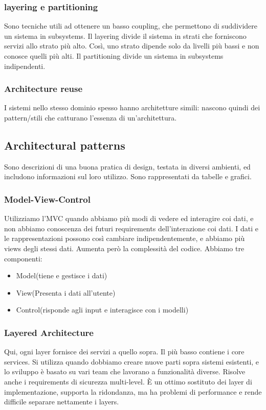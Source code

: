 \documentclass{article}
\begin{document}
\subsubsection{layering e partitioning}
Sono tecniche utili ad ottenere un basso coupling, che permettono di suddividere un sistema in subsystems.
Il layering divide il sistema in strati che forniscono servizi allo strato più alto. 
Così, uno strato dipende solo da livelli più bassi e non conosce quelli più alti. Il partitioning divide un sistema in subsystems
indipendenti.


\subsubsection{Architecture reuse}
I sistemi nello stesso dominio spesso hanno architetture simili: nascono quindi dei pattern/stili che
catturano l'essenza di un'architettura.

\subsection{Architectural patterns}
Sono descrizioni di una buona pratica di design, testata in diversi ambienti, ed includono informazioni sul
loro utilizzo. Sono rappresentati da tabelle e grafici.


\subsubsection{Model-View-Control}

Utilizziamo l'MVC quando abbiamo più modi di vedere ed interagire coi dati, e non abbiamo conoscenza
dei futuri requirements dell'interazione coi dati. I dati e le rappresentazioni possono così cambiare indipendentemente, e abbiamo più views degli stessi dati. Aumenta però la complessità del codice. Abbiamo
tre componenti:
\begin{itemize}
    \item Model(tiene e gestisce i dati)
    \item View(Presenta i dati all'utente)
    \item Control(risponde agli input e interagisce con i modelli)
\end{itemize}

\subsubsection{Layered Architecture}
Qui, ogni layer fornisce dei servizi a quello sopra. Il più basso contiene i core services. Si utilizza quando
dobbiamo creare nuove parti sopra sistemi esistenti, e lo sviluppo è basato su vari team che lavorano a
funzionalità diverse. Risolve anche i requirements di sicurezza multi-level. È un ottimo sostituto dei layer
di implementazione, supporta la ridondanza, ma ha problemi di performance e rende difficile separare
nettamente i layers.
\end{document}

